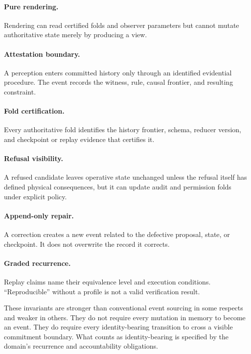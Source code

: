 \documentclass[11pt]{article}
\begin{document}
\paragraph{Pure rendering.} Rendering can read certified folds and observer parameters but cannot mutate authoritative state merely by producing a view.

\paragraph{Attestation boundary.} A perception enters committed history only through an identified evidential procedure. The event records the witness, rule, causal frontier, and resulting constraint.

\paragraph{Fold certification.} Every authoritative fold identifies the history frontier, schema, reducer version, and checkpoint or replay evidence that certifies it.

\paragraph{Refusal visibility.} A refused candidate leaves operative state unchanged unless the refusal itself has defined physical consequences, but it can update audit and permission folds under explicit policy.

\paragraph{Append-only repair.} A correction creates a new event related to the defective proposal, state, or checkpoint. It does not overwrite the record it corrects.

\paragraph{Graded recurrence.} Replay claims name their equivalence level and execution conditions. ``Reproducible'' without a profile is not a valid verification result.

These invariants are stronger than conventional event sourcing in some respects and weaker in others. They do not require every mutation in memory to become an event. They do require every identity-bearing transition to cross a visible commitment boundary. What counts as identity-bearing is specified by the domain's recurrence and accountability obligations.
\end{document}

